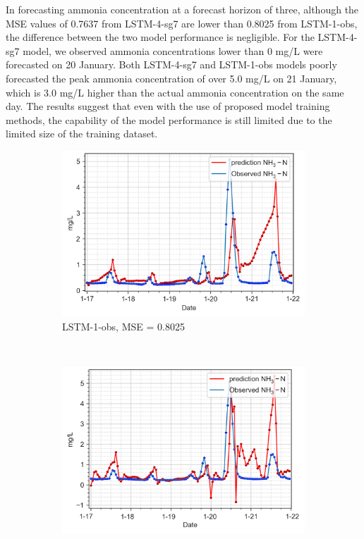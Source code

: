 In forecasting ammonia concentration at a forecast horizon of three, although the MSE values of 0.7637 from LSTM-4-sg7 are lower than 0.8025 from LSTM-1-obs, the difference between the two model performance is negligible. For the LSTM-4-sg7 model, we observed ammonia concentrations lower than 0 mg/L were forecasted on 20 January. Both LSTM-4-sg7 and LSTM-1-obs models poorly forecasted the peak ammonia concentration of over 5.0 mg/L on 21 January, which is 3.0 mg/L higher than the actual ammonia concentration on the same day. The results suggest that even with the use of proposed model training methods, the capability of the model performance is still limited due to the limited size of the training dataset.

\begin{figure}[!ht]
  \centering
  \begin{subfigure}[t]{0.75\textwidth}
    \includegraphics[width=\linewidth]{imgs/results/steps/nh3-lstm-1-fc3.png}
    \caption{LSTM-1-obs, MSE = 0.8025} \label{fig:nh3-lstm-1-fc3}
  \end{subfigure}\\
  \vspace{2em}
  \begin{subfigure}[t]{0.75\textwidth}
    \includegraphics[width=\linewidth]{imgs/results/steps/nh3-lstm-4-fc3.png}

\end{subfigure}
\end{figure}

